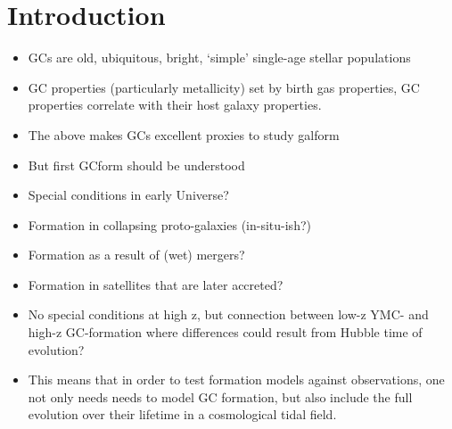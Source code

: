 \documentclass[a4paper,fleqn,usenatbib]{mnras}
\begin{document}
\section{Introduction}
\begin{itemize}
    \item GCs are old, ubiquitous, bright, `simple' single-age stellar populations
    \item GC properties (particularly metallicity) set by birth gas properties, 
        GC properties correlate with their host galaxy properties.
    \item The above makes GCs excellent proxies to study galform
    \item But first GCform should be understood
\end{itemize}
% 

\begin{itemize}
    \item Special conditions in early Universe?
    \item Formation in collapsing proto-galaxies (in-situ-ish?)
    \item Formation as a result of (wet) mergers?
    \item Formation in satellites that are later accreted?
    \item No special conditions at high z, but connection between low-z YMC-
        and high-z GC-formation where differences could result from Hubble time
        of evolution?
    \item This means that in order to test formation models against observations,
        one not only needs needs to model GC formation, but also include the full 
        evolution over their lifetime in a cosmological tidal field.
\end{itemize}
\end{document}
